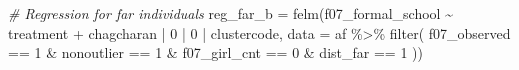 \documentclass[
]{article}
\newenvironment{Shaded}{\begin{snugshade}}{\end{snugshade}}
\newcommand{\AttributeTok}[1]{\textcolor[rgb]{0.77,0.63,0.00}{#1}}
\newcommand{\CommentTok}[1]{\textcolor[rgb]{0.56,0.35,0.01}{\textit{#1}}}
\newcommand{\DecValTok}[1]{\textcolor[rgb]{0.00,0.00,0.81}{#1}}
\newcommand{\FunctionTok}[1]{\textcolor[rgb]{0.00,0.00,0.00}{#1}}
\newcommand{\NormalTok}[1]{#1}
\newcommand{\OtherTok}[1]{\textcolor[rgb]{0.56,0.35,0.01}{#1}}
\newcommand{\SpecialCharTok}[1]{\textcolor[rgb]{0.00,0.00,0.00}{#1}}
\begin{document}
\begin{Shaded}
\begin{Highlighting}[]
\CommentTok{\# Regression for far individuals}
\NormalTok{reg\_far\_b }\OtherTok{=} \FunctionTok{felm}\NormalTok{(f07\_formal\_school }\SpecialCharTok{\textasciitilde{}}\NormalTok{ treatment }\SpecialCharTok{+} 
\NormalTok{                   chagcharan }\SpecialCharTok{|} \DecValTok{0} \SpecialCharTok{|} \DecValTok{0} \SpecialCharTok{|}\NormalTok{ clustercode,}
         \AttributeTok{data =}\NormalTok{ af }\SpecialCharTok{\%\textgreater{}\%} \FunctionTok{filter}\NormalTok{( }
\NormalTok{                              f07\_observed }\SpecialCharTok{==} \DecValTok{1} \SpecialCharTok{\&}
\NormalTok{                              nonoutlier }\SpecialCharTok{==} \DecValTok{1} \SpecialCharTok{\&}
\NormalTok{                              f07\_girl\_cnt }\SpecialCharTok{==} \DecValTok{0} \SpecialCharTok{\&}
\NormalTok{                              dist\_far }\SpecialCharTok{==} \DecValTok{1}
\NormalTok{                              ))}
\end{Highlighting}
\end{Shaded}
\end{document}
